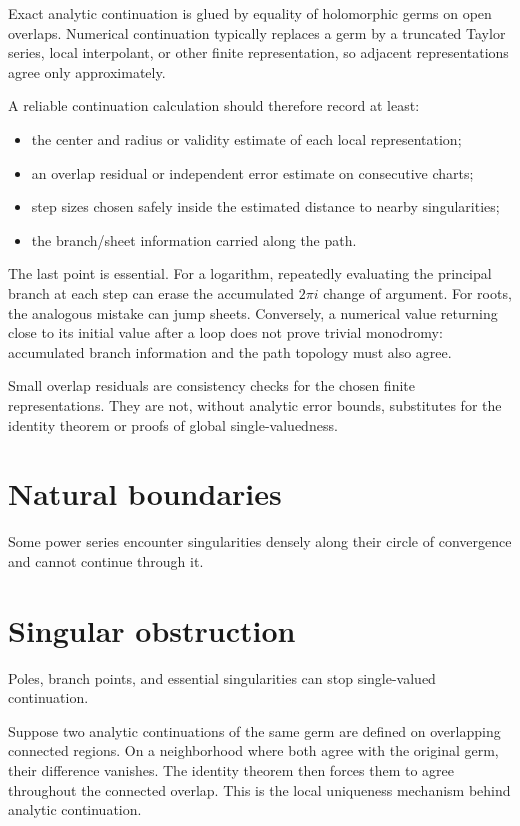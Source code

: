 \begin{remark}
Exact analytic continuation is glued by equality of holomorphic germs on open
overlaps.  Numerical continuation typically replaces a germ by a truncated
Taylor series, local interpolant, or other finite representation, so adjacent
representations agree only approximately.

A reliable continuation calculation should therefore record at least:

\begin{itemize}
\item the center and radius or validity estimate of each local representation;
\item an overlap residual or independent error estimate on consecutive charts;
\item step sizes chosen safely inside the estimated distance to nearby
singularities;
\item the branch/sheet information carried along the path.
\end{itemize}

The last point is essential.  For a logarithm, repeatedly evaluating the
principal branch at each step can erase the accumulated \(2\pi i\) change of
argument.  For roots, the analogous mistake can jump sheets.  Conversely, a
numerical value returning close to its initial value after a loop does not prove
trivial monodromy: accumulated branch information and the path topology must
also agree.

Small overlap residuals are consistency checks for the chosen finite
representations.  They are not, without analytic error bounds, substitutes for
the identity theorem or proofs of global single-valuedness.
\end{remark}

\section{Natural boundaries}
Some power series encounter singularities densely along their circle of convergence and cannot continue through it.

\section{Singular obstruction}
Poles, branch points, and essential singularities can stop single-valued continuation.

\begin{example}\label{ex:iv15-expand-03}
Suppose two analytic continuations of the same germ are defined on overlapping connected regions. On a neighborhood where both agree with the original germ, their difference vanishes. The identity theorem then forces them to agree throughout the connected overlap. This is the local uniqueness mechanism behind analytic continuation.
\end{example}
